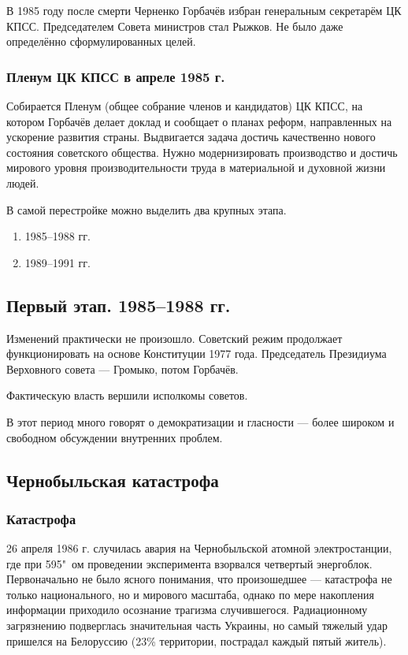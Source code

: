 В 1985 году после смерти Черненко Горбачёв избран генеральным секретарём ЦК КПСС. Председателем Совета министров стал Рыжков. Не было даже определённо сформулированных целей.

\subsubsection{\textbf{Пленум ЦК КПСС в апреле 1985 г.}}

Собирается Пленум (общее собрание членов и кандидатов) ЦК КПСС, на котором Горбачёв делает доклад и сообщает о планах реформ, направленных на ускорение развития страны. Выдвигается задача достичь качественно нового состояния советского общества. Нужно модернизировать производство и достичь мирового уровня производительности труда в материальной и духовной жизни людей.

В самой перестройке можно выделить два крупных этапа.

\begin{enumerate}
    \item 1985--1988 гг.
    \item 1989--1991 гг.
\end{enumerate}

\subsection{Первый этап. 1985--1988 гг.}

Изменений практически не произошло. Советский режим продолжает функционировать на основе Конституции 1977 года. Председатель Президиума Верховного совета --- Громыко, потом Горбачёв.

Фактическую власть вершили исполкомы советов.

В этот период много говорят о демократизации и гласности --- более широком и свободном обсуждении внутренних проблем.

\subsection{Чернобыльская катастрофа}

\subsubsection{\textbf{Катастрофа}}

26 апреля 1986 г. случилась авария на Чернобыльской атомной электростанции, где при 595"~ом проведении эксперимента взорвался четвертый энергоблок. Первоначально не было ясного понимания, что произошедшее --- катастрофа не только национального, но и мирового масштаба, однако по мере накопления информации приходило осознание трагизма случившегося. Радиационному загрязнению подверглась значительная часть Украины, но самый тяжелый удар пришелся на Белоруссию (23\% территории, пострадал каждый пятый житель).

